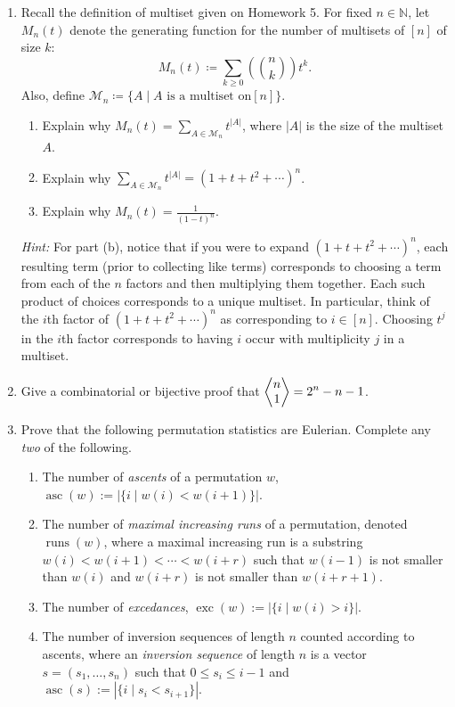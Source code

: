 \documentclass[11pt]{article}%
\theoremstyle{definition}
\DeclareMathOperator{\asc}{asc}
\DeclareMathOperator{\runs}{runs}
\DeclareMathOperator{\exc}{exc}
\newcommand{\euler}[2]{
  \displaystyle \left\langle\begin{matrix}#1  \\#2  \\ \end{matrix}\right\rangle}
\begin{document}
\begin{enumerate}

\item Recall the definition of multiset given on Homework 5.  For fixed $n\in \mathbb{N}$, let $M_n(t)$ denote the generating function for the number of multisets of $[n]$ of size $k$:
\[
M_n(t)\coloneqq \sum_{k\geq 0}\left(\binom{n}{k}\right)t^k.
\]
Also, define $\mathcal{M}_n\coloneqq \{A\mid A\text{ is a multiset on}[n]\}$.
\begin{enumerate}
\item Explain why $\displaystyle M_n(t)=\sum_{A\in\mathcal{M}_n} t^{|A|}$, where $|A|$ is the size of the multiset $A$.
\item Explain why $\displaystyle \sum_{A\in\mathcal{M}_n} t^{|A|}=(1+t+t^2+\cdots)^n$.
\item Explain why $\displaystyle M_n(t)=\frac{1}{(1-t)^n}$.
\end{enumerate}
\emph{Hint:} For part (b), notice that if you were to expand $(1+t+t^2+\cdots)^n$, each resulting term (prior to collecting like terms) corresponds to choosing a term from each of the $n$ factors and then multiplying them together.  Each such product of choices corresponds to a unique multiset.  In particular, think of the $i$th factor of $(1+t+t^2+\cdots)^n$ as corresponding to $i\in [n]$.  Choosing $t^j$ in the $i$th factor corresponds to having $i$ occur with multiplicity $j$ in a multiset.
\item Give a combinatorial or bijective proof that $\displaystyle \euler{n}{1}=2^n-n-1$.

\item Prove that the following permutation statistics are Eulerian. Complete any \emph{two} of the following.  
\begin{enumerate}
\item The number of \emph{ascents} of a permutation $w$, $\asc(w):=|\{i\mid w(i)<w(i+1)\}|$.
\item The number of \emph{maximal increasing runs} of a permutation, denoted $\runs(w)$, where a maximal increasing run is a substring $w(i)<w(i+1)<\cdots < w(i+r)$ such that $w(i-1)$ is not smaller than $w(i)$ and $w(i+r)$ is not smaller than $w(i+r+1)$.
\item The number of \emph{excedances}, $\exc(w):=|\{i\mid w(i)>i\}|$.
\item The number of inversion sequences of length $n$ counted according to ascents, where an \emph{inversion sequence} of length $n$ is a vector $s=(s_1,\ldots,s_n)$ such that $0\leq s_i\leq i-1$ and $\asc(s):=|\{i\mid s_i<s_{i+1}\}|$.
\end{enumerate}


\end{enumerate}
\end{document}
